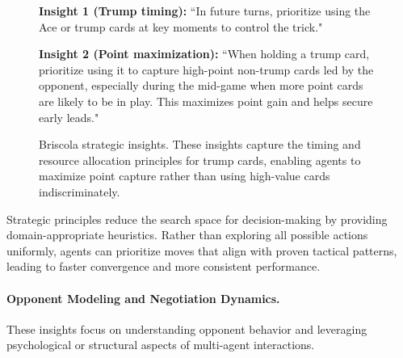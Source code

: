 \begin{figure}[H]
\centering
\begin{tcolorbox}[
    colback=blue!5!white,
    colframe=blue!40!white,
    left=1mm, right=1mm, top=1mm, bottom=1mm,
    width=\textwidth,
    enhanced,
    attach boxed title to top center={yshift=-2mm},
    boxed title style={colback=blue!40!white},
    title={Briscola Strategic Insights},
    label=box:briscola_strategic
]

\textbf{Insight 1 (Trump timing):}
``In future turns, prioritize using the Ace or trump cards at key moments to control the trick."

\textbf{Insight 2 (Point maximization):}
``When holding a trump card, prioritize using it to capture high-point non-trump cards led by the opponent, especially during the mid-game when more point cards are likely to be in play. This maximizes point gain and helps secure early leads."

\end{tcolorbox}
\caption{Briscola strategic insights. These insights capture the timing and resource allocation principles for trump cards, enabling agents to maximize point capture rather than using high-value cards indiscriminately.}
\label{box:briscola_strategic}
\end{figure}

Strategic principles reduce the search space for decision-making by providing domain-appropriate heuristics. Rather than exploring all possible actions uniformly, agents can prioritize moves that align with proven tactical patterns, leading to faster convergence and more consistent performance.

\paragraph{Opponent Modeling and Negotiation Dynamics.}
These insights focus on understanding opponent behavior and leveraging psychological or structural aspects of multi-agent interactions.

